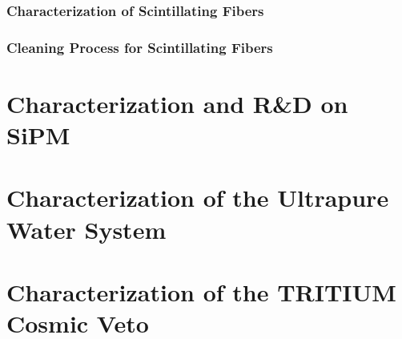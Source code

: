 \documentclass[12pt,a4paper]{book}
\begin{document}
		\subsubsection{Characterization of Scintillating Fibers}\label{subsubsec:CharacterizationFibers}
		
		
		\subsubsection{Cleaning Process for Scintillating Fibers}\label{subsubsec:CleaningProcess}
		
		\newpage
		
	\section[Characterization of the SiPM]{Characterization and R\&D on SiPM}\label{sec:CharacterizationSiPM}
	
	\newpage
	
	\section{Characterization of the Ultrapure Water System}\label{sec:CharacterizationUltraPureWaterSystem}
	
					 
	\section[Characterization of the Cosmic Veto]{Characterization of the TRITIUM Cosmic Veto}\label{sec:TritiumActiveVeto}
	
	\newpage
		
	
					 
\end{document}
